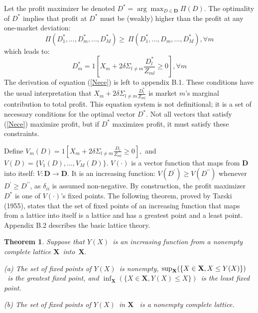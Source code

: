 \documentclass[notitlepage,onecolumn,11pt]{article}
\newtheorem{theorem}{Theorem}
\begin{document}
Let the profit maximizer be denoted $D^{\ast }=\arg \max_{D\in \mathbf{D}%
}\Pi (D)$. The optimality of $D^{\ast }$ implies that profit at $D^{\ast }$
must be (weakly) higher than the profit at any one-market deviation:%
\begin{equation*}
\Pi (D_{1}^{\ast },...,D_{m}^{\ast },...,D_{M}^{\ast })\geq \ \Pi
(D_{1}^{\ast },...,D_{m},...,D_{M}^{\ast }),\forall m
\end{equation*}%
which leads to:%
\begin{equation}
D_{m}^{\ast }=1[X_{m}+2\delta \Sigma _{l\neq m}\frac{D_{l}^{\ast }}{Z_{ml}}%
\geq 0],\forall m  \label{Nece}
\end{equation}%
The derivation of equation (\ref{Nece}) is left to appendix B.1. These
conditions have the usual interpretation that $X_{m}+2\delta \Sigma _{l\neq
m}\frac{D_{l}^{\ast }}{Z_{ml}}$ is market $m$'s marginal contribution to
total profit. This equation system is not definitional; it is a set of
necessary conditions for the optimal vector $D^{\ast }$. Not all vectors
that satisfy (\ref{Nece}) maximize profit, but if $D^{\ast }$ maximizes
profit, it must satisfy these constraints.

Define $V_{m}(D)=1[X_{m}+2\delta \Sigma _{l\neq m}\frac{D_{l}}{Z_{ml}}\geq
0],$ and $V(D)=\{V_{1}(D),...,V_{M}(D)\}.$ $V(\cdot )$ is a vector function
that maps from $\mathbf{D}$ into itself: $V:\mathbf{D}\rightarrow \mathbf{D}%
. $ It is an increasing function: $V(D^{\prime })\geq V(D^{\prime \prime })$
whenever $D^{\prime }\geq D^{\prime \prime }$, as $\delta _{ii}$ is assumed
non-negative$.$ By construction, the profit maximizer $D^{\ast }$ is one of $%
V(\cdot )$'s fixed points. The following theorem, proved by Tarski (1955),
states that the set of fixed points of an increasing function that maps from
a lattice into itself is a lattice and has a greatest point and a least
point. Appendix B.2 describes the basic lattice theory.

\begin{theorem}
\label{Tarski} \textit{Suppose that }$Y(X)$\textit{\ is an increasing
function from a nonempty complete lattice }$\mathbf{X}$\textit{\ into\ }$%
\mathbf{X}.$

(a) \textit{The set of fixed points of }$Y(X)$\textit{\ is nonempty, }$\sup_{%
\mathbf{X}}(\{X\in \mathbf{X},X\leq Y(X)\})$\textit{\ is the greatest fixed
point, and }$\inf_{\mathbf{X}}(\{X\in \mathbf{X},Y(X)\leq X\})$\textit{\ is
the least fixed point.}

(b) \textit{The set of fixed points of }$Y(X)$\textit{\ in }$\mathbf{X}$%
\textit{\ is a nonempty complete lattice.}
\end{theorem}
\end{document}
